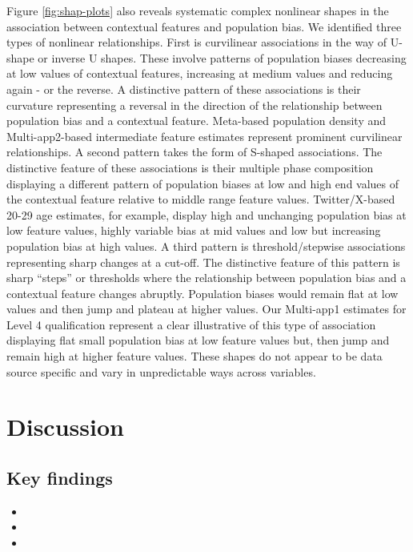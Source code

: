 \documentclass[]{rsos}%
\providecommand{\tightlist}{%
  \setlength{\itemsep}{0pt}\setlength{\parskip}{0pt}}
\begin{document}
Figure \ref{fig:shap-plots} also reveals systematic complex nonlinear shapes in the association between contextual features and population bias. We identified three types of nonlinear relationships. First is curvilinear associations in the way of U-shape or inverse U shapes. These involve patterns of population biases decreasing at low values of contextual features, increasing at medium values and reducing again - or the reverse. A distinctive pattern of these associations is their curvature representing a reversal in the direction of the relationship between population bias and a contextual feature. Meta-based population density and Multi-app2-based intermediate feature estimates represent prominent curvilinear relationships. A second pattern takes the form of S-shaped associations. The distinctive feature of these associations is their multiple phase composition displaying a different pattern of population biases at
low and high end values of the contextual feature relative to middle range feature values. Twitter/X-based 20-29 age estimates, for example, display high and unchanging population bias at low feature values, highly variable bias at mid values and low but increasing population bias at high values. A third pattern is threshold/stepwise associations representing sharp changes at a cut-off. The distinctive feature of this pattern is sharp ``steps'' or thresholds where the relationship between population bias and a contextual feature changes abruptly. Population biases would remain flat at low values and then jump and plateau at higher values. Our Multi-app1 estimates for Level 4 qualification represent a clear illustrative of this type of association displaying flat small population bias at low feature values but, then jump and remain high at higher feature values. These shapes do not appear to be data source specific and vary in unpredictable ways across variables.

\section{Discussion}\label{discussion}

\subsection{Key findings}\label{key-findings}

\begin{itemize}
\tightlist
\item
\item
\item
\end{itemize}
\end{document}
